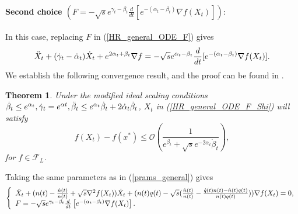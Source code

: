 \documentclass{article}
\theoremstyle{plain}
\newtheorem{theorem}{Theorem}[section]
\theoremstyle{definition}
\theoremstyle{remark}
\begin{document}
\paragraph{Second choice \( ({F = -\sqrt{s}e^{\gamma_t-\beta_t}\frac{d}{dt}\left[e^{-(\alpha_t-\beta_t)}\nabla f(X_t)\right]}):\)}
    In this case, replacing $F$ in (\ref{HR_general_ODE_F}) gives
    \begin{align}\label{HR_general_ODE_F_Shi}
    \Ddot{X}_t + (\dot{\gamma}_t-\dot{\alpha}_t)\dot{X}_t+e^{2\alpha_t+\beta_t}\nabla f = -\sqrt{s}e^{\alpha_t-\beta_t}\frac{d}{dt}[e^{-(\alpha_t-\beta_t)}\nabla f(X_t)].
\end{align}
We establish the following convergence result, and the proof can be found in .
\begin{theorem}\label{Theorem_ODE_Shi}
Under the modified ideal scaling conditions \(\dot\beta_t\leq e^{\alpha_t}, \dot\gamma_t=e^{\alpha t}, \Ddot{\beta}_t\leq e^{\alpha_t}\dot \beta_t + 2\dot \alpha_t \dot \beta_t\), \(X_t\) in (\ref{HR_general_ODE_F_Shi}) will satisfy 
\[f(X_t)-f(x^*)\leq \mathcal{O}\left(\frac{1}{e^{\beta_t}+\sqrt{s}e^{-2\alpha_t}\dot \beta_t}\right),\]
for \(f \in \mathcal{F}_L\).
\end{theorem}
 Taking the same parameters as in (\ref{prams_general}) gives
\begin{gather}
    \begin{aligned}\label{HR_cnts_general_npq_SHI}
\left\{
\begin{array}{l}
     \Ddot{X}_t + (n(t)-\frac{\dot n(t)}{n(t)}+\sqrt{s}\nabla^2 f(X_t))\dot{X}_t+(n(t)q(t)-\sqrt{s} (\frac{\dot n(t)}{n(t)}-\frac{\dot q(t)n(t)-\dot n(t)q(t)}{n(t)q(t)}))\nabla f(X_t)=0,   \\
     F = -\sqrt{s}e^{\gamma_t-\beta_t}\frac{d}{dt}\left[e^{-(\alpha_t-\beta_t)}\nabla f(X_t)\right]. 
\end{array}\right.\raisetag{12pt}
\end{aligned}
\end{gather}
 
\end{document}
